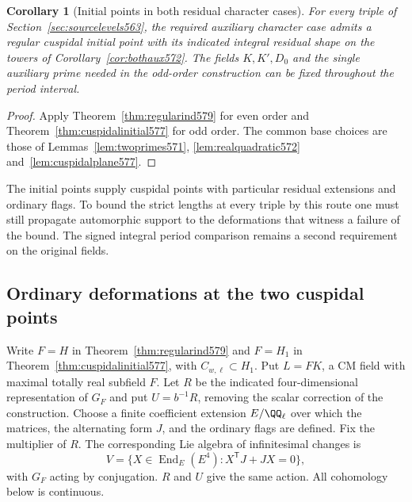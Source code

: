 \documentclass[a4paper,11pt]{article}
\newtheorem{corollary}[proposition]{Corollary}
\theoremstyle{definition}
\theoremstyle{remark}
\numberwithin{equation}{section}
\begin{document}
\begin{corollary}[Initial points in both residual character cases]
\leavevmode\label{cor:bothinitial579}
For every triple of Section~\ref{sec:sourcelevels563}, the
required auxiliary character case admits a regular cuspidal
initial point with its indicated integral residual shape on
the towers of Corollary~\ref{cor:bothaux572}. The fields
\(K,K',D_0\) and the single auxiliary prime needed in
the odd-order construction can be fixed throughout the
period interval.
\end{corollary}
\begin{proof}
Apply Theorem~\ref{thm:regularind579} for even order and
Theorem~\ref{thm:cuspidalinitial577} for odd order. The
common base choices are those of Lemmas~\ref{lem:twoprimes571},
\ref{lem:realquadratic572} and~\ref{lem:cuspidalplane577}.
\end{proof}

The initial points supply cuspidal points with particular
residual extensions and ordinary flags. To bound the
strict lengths at every triple by this route one must
still propagate automorphic support to the deformations
that witness a failure of the bound. The signed integral
period comparison remains a second requirement on the
original fields.


\subsection{Ordinary deformations at the two cuspidal points}
\label{sec:seedweights580}

Write \(F=H\) in Theorem~\ref{thm:regularind579} and \(F=H_1\)
in Theorem~\ref{thm:cuspidalinitial577}, with \(C_{w,\ell}\subset H_1\).
Put \(L=FK\), a CM field with maximal totally real subfield \(F\).
Let \(R\) be the indicated four-dimensional representation of \(G_F\)
and put \(U=b^{-1}R\), removing the scalar correction of the
construction. Choose a finite coefficient extension \(E/\QQ_\ell\)
over which the matrices, the alternating form \(J\), and the ordinary
flags are defined. Fix the multiplier of \(R\). The corresponding
Lie algebra of infinitesimal changes is
\[
   V=\{X\in\operatorname{End}_E(E^4): X^{\mathsf T}J+JX=0\},
\]
with \(G_F\) acting by conjugation. \(R\) and \(U\) give the same
action. All cohomology below is continuous.
\end{document}
